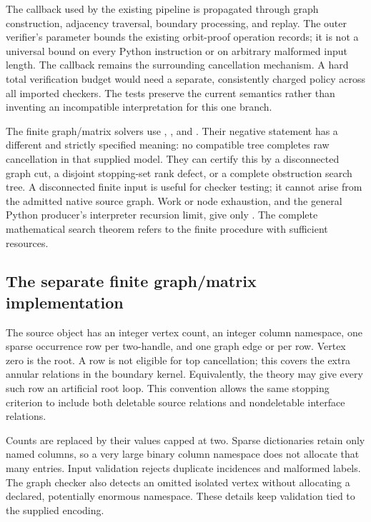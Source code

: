 The callback used by the existing pipeline is propagated through graph
construction, adjacency traversal, boundary processing, and replay.
The outer verifier's  parameter bounds the existing
orbit-proof operation records; it is not a universal bound on every Python
instruction or on arbitrary malformed input length.  The callback remains
the surrounding cancellation mechanism.  A hard total verification budget
would need a separate, consistently charged policy across all imported
checkers.  The tests preserve the current semantics rather than inventing
an incompatible interpretation for this one branch.

The finite graph/matrix solvers use , ,
and .  Their negative statement has a different and
strictly specified meaning: no compatible tree completes raw cancellation
in that supplied model.  They can certify this by a disconnected graph
cut, a disjoint stopping-set rank defect, or a complete obstruction search
tree.  A disconnected finite input is useful for checker testing; it cannot
arise from the admitted native source graph.  Work or node exhaustion, and
the general Python producer's interpreter recursion limit, give only
.  The complete mathematical search theorem refers to
the finite procedure with sufficient resources.

\subsection{The separate finite graph/matrix implementation}
The source object has an integer vertex count, an integer column namespace,
one sparse occurrence row per two-handle, and one graph edge or 
per row.  Vertex zero is the root.  A  row is not eligible for
top cancellation; this covers the extra annular relations in the boundary
kernel.  Equivalently, the theory may give every such row an artificial
root loop.  This convention allows the same stopping criterion to include
both deletable source relations and nondeletable interface relations.

Counts are replaced by their values capped at two.  Sparse dictionaries
retain only named columns, so a very large binary column namespace does
not allocate that many entries.  Input validation rejects duplicate
incidences and malformed labels.  The graph checker also detects an omitted
isolated vertex without allocating a declared, potentially enormous
namespace.  These details keep validation tied to the supplied encoding.


